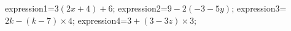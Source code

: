 \documentclass[exercice]{thedocument}%
\begin{document}
%
    \>expression1=$3(2x+4)+6$;%
    \>expression2=$9-2(-3-5y)$;%
    \>expression3=$2k-(k-7)\times4$;%
    \>expression4=$3+(3-3z)\times3$;%
\end{document}
